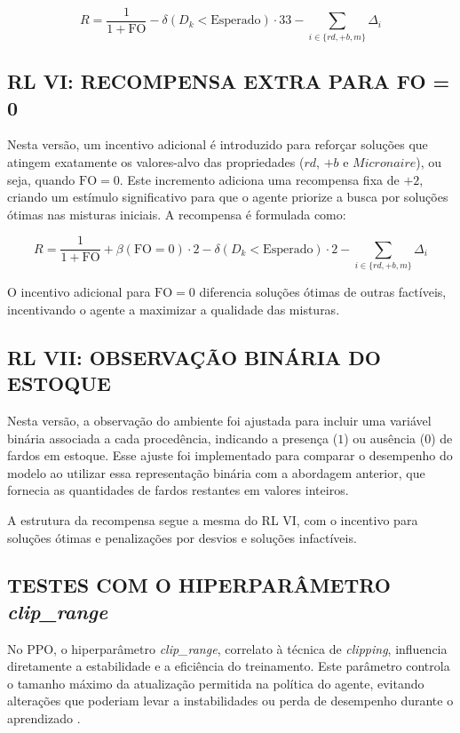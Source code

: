 \documentclass[
    12pt,                %
    openright,           %
    oneside,             %
    a4paper,             %
    english,             %
    spanish,             %
    brazil               %
]{ufscar}
\begin{document}
\begin{equation}
R = \frac{1}{1 + \text{FO}} - \delta(D_k < \text{Esperado}) \cdot 33 - \sum_{i \in \{rd, +b, m\}} \Delta_i
\end{equation}

\subsection{RL VI: RECOMPENSA EXTRA PARA FO = 0}

Nesta versão, um incentivo adicional é introduzido para reforçar soluções que atingem exatamente os valores-alvo das propriedades (\(rd\), \(+b\) e \(Micronaire\)), ou seja, quando \(\text{FO} = 0\). Este incremento adiciona uma recompensa fixa de \(+2\), criando um estímulo significativo para que o agente priorize a busca por soluções ótimas nas misturas iniciais. A recompensa é formulada como:

\begin{equation}
R = \frac{1}{1 + \text{FO}} + \beta(\text{FO} = 0) \cdot 2 - \delta(D_k < \text{Esperado}) \cdot 2 - \sum_{i \in \{rd, +b, m\}} \Delta_i
\end{equation}

O incentivo adicional para \(\text{FO} = 0\) diferencia soluções ótimas de outras factíveis, incentivando o agente a maximizar a qualidade das misturas.

\subsection{RL VII: OBSERVAÇÃO BINÁRIA DO ESTOQUE}

Nesta versão, a observação do ambiente foi ajustada para incluir uma variável binária associada a cada procedência, indicando a presença (\(1\)) ou ausência (\(0\)) de fardos em estoque. Esse ajuste foi implementado para comparar o desempenho do modelo ao utilizar essa representação binária com a abordagem anterior, que fornecia as quantidades de fardos restantes em valores inteiros.

A estrutura da recompensa segue a mesma do RL VI, com o incentivo para soluções ótimas e penalizações por desvios e soluções infactíveis.


\subsection{TESTES COM O HIPERPARÂMETRO \textit{clip\_range}}

No PPO, o hiperparâmetro \textit{clip\_range}, correlato à técnica de \textit{clipping}, influencia diretamente a estabilidade e a eficiência do treinamento. Este parâmetro controla o tamanho máximo da atualização permitida na política do agente, evitando alterações que poderiam levar a instabilidades ou perda de desempenho durante o aprendizado \cite{schulman_proximal_2017}.
\end{document}
